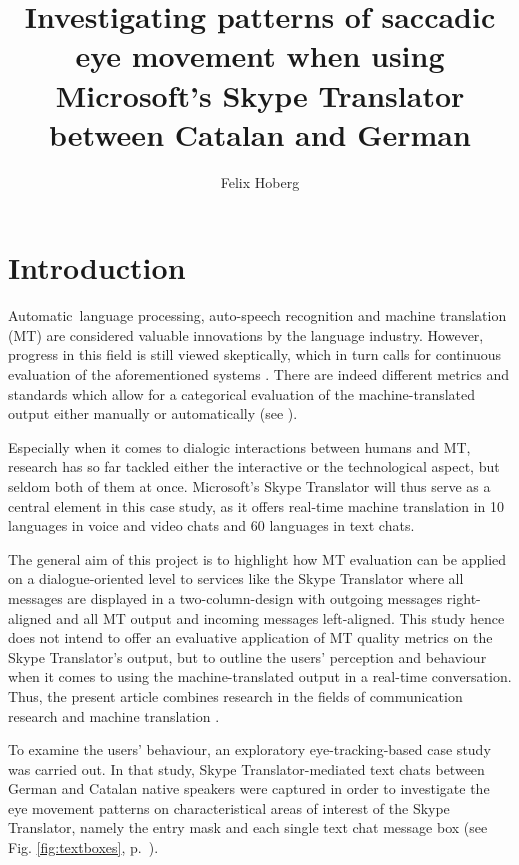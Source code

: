 \documentclass[output=paper,colorlinks,citecolor=brown]{langscibook}
\author{Felix Hoberg\affiliation{Leipzig University}}
\title[Patterns of saccadic eye movement when using Skype Translator]{Investigating patterns of saccadic eye movement when using Microsoft's Skype Translator between Catalan and German}
\begin{document}
\maketitle



\section{Introduction} 
\label{hoberg:intro}


Automatic~language processing, auto-speech recognition and machine translation (MT) are considered valuable innovations by the language industry. However, progress in this field is still viewed skeptically, which in turn calls for continuous evaluation of the aforementioned systems \citep{ramlow_maschinelle_2009, bowker_machine_2019}. There are indeed different metrics and standards which allow for a categorical evaluation of the machine-translated output either manually or automatically (see ).

Especially when it comes to dialogic interactions between humans and MT, research has so far tackled either the interactive or the technological aspect, but seldom both of them at once. Microsoft’s Skype Translator will thus serve as a central element in this case study, as it offers real-time machine translation in 10 languages in voice and video chats and 60 languages in text chats.

The general aim of this project is to highlight how MT evaluation can be applied on a dialogue-oriented level to services like the Skype Translator where all messages are displayed in a two-column-design with outgoing messages right-aligned and all MT output and incoming messages left-aligned. This study hence does not intend to offer an evaluative application of MT quality metrics on the Skype Translator's output, but to outline the users' perception and behaviour when it comes to using the machine-translated output in a real-time conversation. Thus, the present article combines research in the fields of communication research \citep[e.~g.][]{beiswenger_sprachhandlungskoordination_2007} and machine translation \citep[e.~g.][]{fiser_investigating_2017}.

To examine the users' behaviour, an exploratory eye-tracking-based case study was carried out. In that study, Skype Translator-mediated text chats between German and Catalan native speakers were captured in order to investigate the eye movement patterns on characteristical areas of interest of the Skype Translator, namely the entry mask and each single text chat message box (see Fig. \ref{fig:textboxes}, p.~\pageref{fig:textboxes}).
\end{document}
